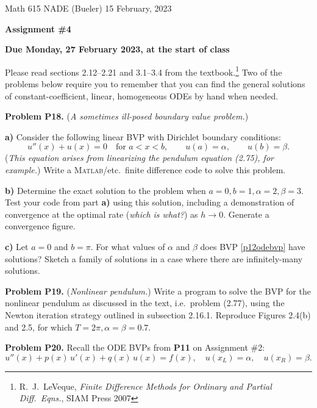 \documentclass[12pt]{amsart}
\newcommand{\Matlab}{\textsc{Matlab}\xspace}
\newcommand{\prob}[1]{\bigskip\noindent\textbf{#1}\quad }
\newcommand{\epart}[1]{\medskip\noindent\textbf{#1)}\quad }
\begin{document}
\scriptsize \noindent Math 615 NADE (Bueler) \hfill 15 February, 2023
\normalsize

\medskip\bigskip

\Large\centerline{\textbf{Assignment \#4}}
\large
\bigskip

\centerline{\textbf{Due Monday, 27 February 2023, at the start of class}}
\bigskip
\normalsize

\thispagestyle{empty}

\bigskip
Please read sections 2.12--2.21 and 3.1--3.4 from the textbook.\footnote{R.~J.~LeVeque, \emph{Finite Difference Methods for Ordinary and Partial Diff.~Eqns.}, SIAM Press 2007}  Two of the problems below require you to remember that you can find the general solutions of constant-coefficient, linear, homogeneous ODEs by hand when needed.

\medskip
\prob{Problem P18.}  (\emph{A sometimes ill-posed boundary value problem.}) 

\epart{a}  Consider the following linear BVP with Dirichlet boundary conditions:
\begin{equation}
u''(x) +  u(x) = 0 \quad \text{for $a< x< b$}, \qquad u(a)=\alpha, \qquad u(b)=\beta.  \label{p12odebvp}
\end{equation}
(\emph{This equation arises from linearizing the pendulum equation (2.75), for example.})  Write a \Matlab/etc.~finite difference code to solve this problem.

\epart{b}  Determine the exact solution to the problem when $a = 0, b = 1, \alpha = 2, \beta = 3$.  Test your code from part \textbf{a)} using this solution, including a demonstration of convergence at the optimal rate (\emph{which is what?}) as $h \to 0$.  Generate a convergence figure.

\epart{c}  Let $a=0$ and $b=\pi$.  For what values of $\alpha$ and $\beta$ does BVP \eqref{p12odebvp} have solutions?  Sketch a family of solutions in a case where there are infinitely-many solutions.


\prob{Problem P19.}  (\emph{Nonlinear pendulum.})   Write a program to solve the BVP for the nonlinear pendulum as discussed in the text, i.e.~problem (2.77), using the Newton iteration strategy outlined in subsection 2.16.1.  Reproduce Figures 2.4(b) and 2.5, for which $T=2\pi,\alpha=\beta=0.7$.


\prob{Problem P20.}  Recall the ODE BVPs from \textbf{P11} on Assignment \#2:
\begin{equation*}
u''(x) + p(x)\, u'(x) + q(x)\, u(x) = f(x), \quad u(x_L) = \alpha, \quad u(x_R) = \beta.
\end{equation*}
\end{document}
